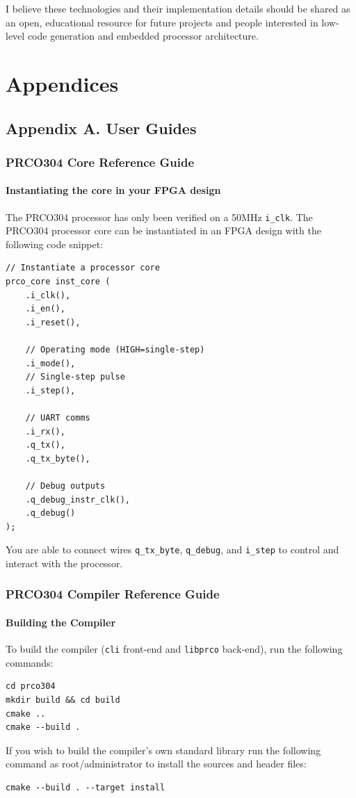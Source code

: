 \documentclass[11pt,a4paper]{report}
\newcommand{\scname}{PRCO304}
\begin{document}
I believe these technologies and their implementation details should be shared as an open, educational resource for future projects and people interested in low-level code generation and embedded processor architecture.






\newpage



\newpage
\chapter{Appendices}
\linespread{1.0}
{\hypersetup{linkcolor=black}
\startcontents[chapters]
}

\section{Appendix A. User Guides}
\subsection{\scname{} Core Reference Guide}
\subsubsection*{Instantiating the core in your FPGA design}
The \scname{} processor has only been verified on a 50MHz \verb|i_clk|. 
The \scname{} processor core can be instantiated in an FPGA design with the following code snippet:
\begin{verbatim}
// Instantiate a processor core
prco_core inst_core (
    .i_clk(), 
    .i_en(), 
    .i_reset(),
    
    // Operating mode (HIGH=single-step)
    .i_mode(),
    // Single-step pulse
    .i_step(),
    
    // UART comms
    .i_rx(),
    .q_tx(),
    .q_tx_byte(),
    
    // Debug outputs
    .q_debug_instr_clk(),
    .q_debug()
);
\end{verbatim}
You are able to connect wires \verb|q_tx_byte|, \verb|q_debug|, and \verb|i_step| to control and interact with the processor.

\subsection{\scname{} Compiler Reference Guide}
\subsubsection*{Building the Compiler}
To build the compiler (\verb|cli| front-end and \verb|libprco| back-end), run the following commands:
\begin{verbatim}
cd prco304
mkdir build && cd build
cmake ..
cmake --build .
\end{verbatim}
If you wish to build the compiler's own standard library run the following command as root/administrator to install the sources and header files:
\begin{verbatim}
cmake --build . --target install
\end{verbatim}
\end{document}
